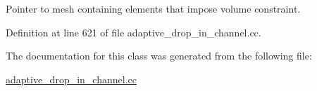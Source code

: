 Pointer to mesh containing elements that impose volume constraint. 



Definition at line 621 of file adaptive\+\_\+drop\+\_\+in\+\_\+channel.\+cc.



The documentation for this class was generated from the following file\+:\begin{DoxyCompactItemize}
\item 
\hyperlink{adaptive__drop__in__channel_8cc}{adaptive\+\_\+drop\+\_\+in\+\_\+channel.\+cc}\end{DoxyCompactItemize}
